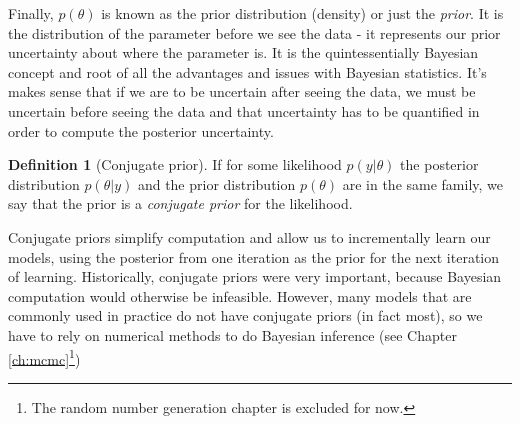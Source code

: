 \documentclass{book}
\theoremstyle{plain}%
\theoremstyle{definition}
\newtheorem{definition}{Definition}[section]
\begin{document}
Finally, $p(\theta)$ is known as the prior distribution (density) or just the \emph{prior}. It is the distribution of the parameter before we see the data - it represents our prior uncertainty about where the parameter is. It is the quintessentially Bayesian concept and root of all the advantages and issues with Bayesian statistics. It's makes sense that if we are to be uncertain after seeing the data, we must be uncertain before seeing the data and that uncertainty has to be quantified in order to compute the posterior uncertainty.

\begin{definition}[Conjugate prior] If for some likelihood $p(y|\theta)$ the posterior distribution $p(\theta | y)$ and the prior distribution $p(\theta)$ are in the same family, we say that the prior is a \emph{conjugate prior} for the likelihood.
\end{definition}

Conjugate priors simplify computation and allow us to incrementally learn our models, using the posterior from one iteration as the prior for the next iteration of learning. Historically, conjugate priors were very important, because Bayesian computation would otherwise be infeasible. However, many models that are commonly used in practice do not have conjugate priors (in fact most), so we have to rely on numerical methods to do Bayesian inference (see Chapter \ref{ch:mcmc}\footnote{The random number generation chapter is excluded for now.})
\end{document}
